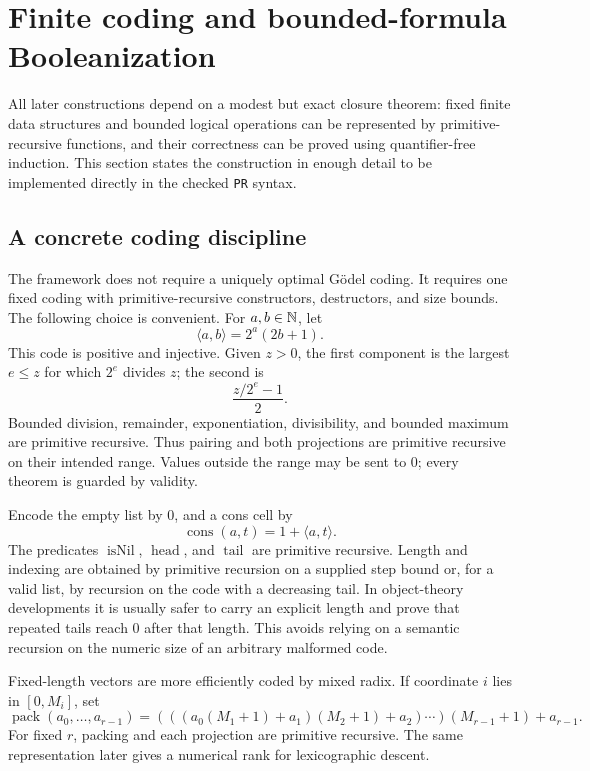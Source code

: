 \section{Finite coding and bounded-formula Booleanization}
\label{sec:booleanization}

All later constructions depend on a modest but exact closure theorem: fixed finite data structures and
bounded logical operations can be represented by primitive-recursive functions, and their correctness can
be proved using quantifier-free induction.  This section states the construction in enough detail to be
implemented directly in the checked \texttt{PR} syntax.

\subsection{A concrete coding discipline}

The framework does not require a uniquely optimal G\"odel coding.  It requires one fixed coding with
primitive-recursive constructors, destructors, and size bounds.  The following choice is convenient.
For \(a,b\in\mathbb N\), let
\[
  \langle a,b\rangle = 2^a(2b+1).
\]
This code is positive and injective.  Given \(z>0\), the first component is the largest \(e\le z\) for
which \(2^e\) divides \(z\); the second is
\[
  \frac{z/2^e-1}{2}.
\]
Bounded division, remainder, exponentiation, divisibility, and bounded maximum are primitive recursive.
Thus pairing and both projections are primitive recursive on their intended range.  Values outside the
range may be sent to \(0\); every theorem is guarded by validity.

Encode the empty list by \(0\), and a cons cell by
\[
  \operatorname{cons}(a,t)=1+\langle a,t\rangle.
\]
The predicates \(\operatorname{isNil}\), \(\operatorname{head}\), and \(\operatorname{tail}\) are
primitive recursive.  Length and indexing are obtained by primitive recursion on a supplied step bound or,
for a valid list, by recursion on the code with a decreasing tail.  In object-theory developments it is
usually safer to carry an explicit length and prove that repeated tails reach \(0\) after that length.  This
avoids relying on a semantic recursion on the numeric size of an arbitrary malformed code.

Fixed-length vectors are more efficiently coded by mixed radix.  If coordinate \(i\) lies in
\([0,M_i]\), set
\[
  \operatorname{pack}(a_0,\ldots,a_{r-1})
   = (((a_0(M_1+1)+a_1)(M_2+1)+a_2)\cdots)(M_{r-1}+1)+a_{r-1}.
\]
For fixed \(r\), packing and each projection are primitive recursive.  The same representation later gives
a numerical rank for lexicographic descent.

